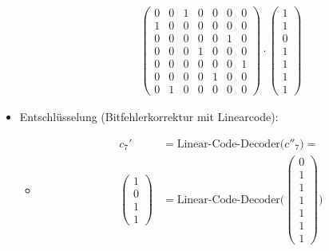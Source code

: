\begin{itemize}
\begin{itemize}
\begin{align*}
\begin{pmatrix}
                0 & 0 & 1 & 0 & 0 & 0 & 0\\
                1 & 0 & 0 & 0 & 0 & 0 & 0\\
                0 & 0 & 0 & 0 & 0 & 1 & 0\\
                0 & 0 & 0 & 1 & 0 & 0 & 0\\
                0 & 0 & 0 & 0 & 0 & 0 & 1\\
                0 & 0 & 0 & 0 & 1 & 0 & 0\\
                0 & 1 & 0 & 0 & 0 & 0 & 0
            \end{pmatrix}
            \cdot
            \begin{pmatrix} %
                1\\
                1\\
                0\\
                1\\
                1\\
                1\\
                1
            \end{pmatrix}
        \end{align*}
    \end{itemize}
    \item Entschlüsselung (Bitfehlerkorrektur mit Linearcode):
    \begin{itemize}
        \item[]
        \begin{align*}
            c_{7}'\,&=\text{Linear-Code-Decoder($c''_7$)}=\\
            \begin{pmatrix} %
                1\\
                0\\
                1\\
                1
            \end{pmatrix}
            &=\text{Linear-Code-Decoder(}
            \begin{pmatrix}
                0\\
                1\\
                1\\
                1\\
                1\\
                1\\
                1
            \end{pmatrix}
            \text{)}
        \end{align*}

\end{itemize}
\end{itemize}
